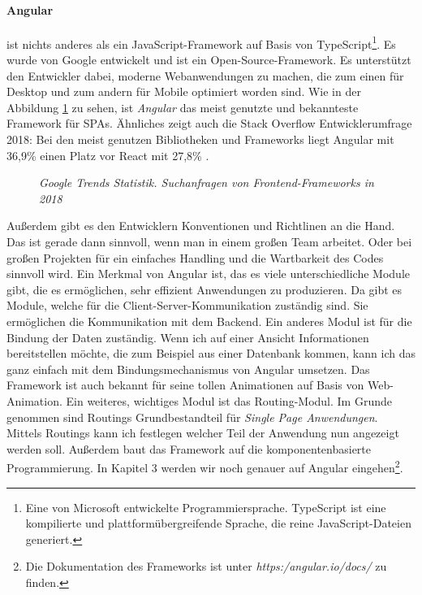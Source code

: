 \paragraph{Angular}
\label{p:angular}
%
ist nichts anderes als ein JavaScript-Framework auf Basis von TypeScript\footnote{Eine von Microsoft entwickelte Programmiersprache. TypeScript ist eine kompilierte und plattformübergreifende Sprache, die reine JavaScript-Dateien generiert.}. Es wurde von Google entwickelt und ist ein Open-Source-Framework. Es unterstützt den Entwickler dabei, moderne Webanwendungen zu machen, die zum einen für Desktop und zum andern für Mobile optimiert worden sind. Wie in der Abbildung \ref{fig:googletrends} zu sehen, ist \textit{Angular} das meist genutzte und bekannteste Framework für SPAs. Ähnliches zeigt auch die Stack Overflow Entwicklerumfrage 2018: Bei den meist genutzen Bibliotheken und Frameworks liegt Angular mit 36,9\% einen Platz vor React mit 27,8\% \cite{stackoverflow_stack_2018}.
%
\begin{figure}[h]
	\centering
	{}
	\caption[Audi Konfigurator]{\textit{Google Trends Statistik. Suchanfragen von Frontend-Frameworks in 2018}}
	\label{fig:googletrends}
\end{figure}
%
Außerdem gibt es den Entwicklern Konventionen und Richtlinen an die Hand. Das ist gerade dann sinnvoll, wenn man in einem großen Team arbeitet. Oder bei großen Projekten für ein einfaches Handling und die Wartbarkeit des Codes sinnvoll wird. Ein Merkmal von Angular ist, das es viele unterschiedliche Module gibt, die es ermöglichen, sehr effizient Anwendungen zu produzieren. Da gibt es Module, welche für die Client-Server-Kommunikation zuständig sind. Sie ermöglichen die Kommunikation mit dem Backend. Ein anderes Modul ist für die Bindung der Daten zuständig. Wenn ich auf einer Ansicht Informationen bereitstellen möchte, die zum Beispiel aus einer Datenbank kommen, kann ich das ganz einfach mit dem Bindungsmechanismus von Angular umsetzen. Das Framework ist auch bekannt für seine tollen Animationen auf Basis von Web-Animation. Ein weiteres, wichtiges Modul ist das Routing-Modul. Im Grunde genommen sind Routings Grundbestandteil für \textit{Single Page Anwendungen}. Mittels Routings kann ich festlegen welcher Teil der Anwendung nun angezeigt werden soll. Außerdem baut das Framework auf die komponentenbasierte Programmierung. In Kapitel 3 werden wir noch genauer auf Angular eingehen\footnote{Die Dokumentation des Frameworks ist unter \textit{https:/angular.io/docs/} zu finden.}.
%

